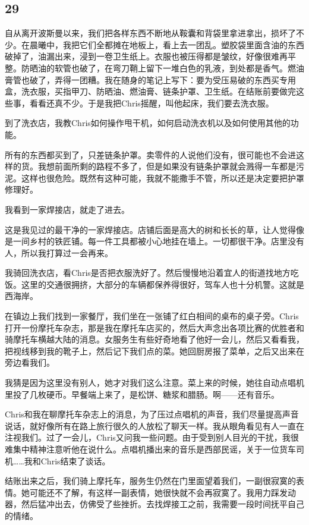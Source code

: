 \documentclass[UTF8]{article}
\begin{document}
\subsection*{29}
\par 自从离开波斯曼以来，我们把各样东西不断地从鞍囊和背袋里拿进拿出，损坏了不少。在晨曦中，我把它们全都摊在地板上，看上去一团乱。塑胶袋里面含油的东西破掉了，油漏出来，浸到一卷卫生纸上。衣服也被压得都是皱纹，好像很难再平整。防晒油的软管也破了，在弯刀鞘上留下一堆白色的乳液，到处都是香气。燃油膏管也破了，弄得一团糟。我在随身的笔记上写下：要为受压易破的东西买专用盒，洗衣服，买指甲刀、防晒油、燃油膏、链条护罩、卫生纸。在结账前要做完这些事，看看还真不少。于是我把Chris摇醒，叫他起床，我们要去洗衣服。
\par 到了洗衣店，我教Chris如何操作甩干机，如何启动洗衣机以及如何使用其他的功能。
\par 所有的东西都买到了，只差链条护罩。卖零件的人说他们没有，很可能也不会进这样的货。我想前面所剩的路程不多了，但是如果没有链条护罩就会溅得一车都是污泥。这样也很危险。既然有这种可能，我就不能撒手不管，所以还是决定要把护罩修理好。
\par 我看到一家焊接店，就走了进去。
\par 这是我见过的最干净的一家焊接店。店铺后面是高大的树和长长的草，让人觉得像是一间乡村的铁匠铺。每一件工具都被小心地挂在墙上。一切都很干净。店里没有人，所以我打算过一会再来。
\par 我骑回洗衣店，看Chris是否把衣服洗好了。然后慢慢地沿着宜人的街道找地方吃饭。这里的交通很拥挤，大部分的车辆都保养得很好，驾车人也十分机警。这就是西海岸。
\par 在镇边上我们找到一家餐厅，我们坐在一张铺了红白相间的桌布的桌子旁。Chris打开一份摩托车杂志，那是我在摩托车店买的，然后大声念出各项比赛的优胜者和骑摩托车横越大陆的消息。女服务生有些好奇地看了他好一会儿，然后又看看我，把视线移到我的靴子上，然后记下我们点的菜。她回厨房报了菜单，之后又出来在旁边看我们。
\par 我猜是因为这里没有别人，她才对我们这么注意。菜上来的时候，她往自动点唱机里投了几枚硬币。早餐端上来了，是松饼、糖浆和腊肠。啊——还有音乐。
\par Chris和我在聊摩托车杂志上的消息，为了压过点唱机的声音，我们尽量提高声音说话，就好像所有在路上旅行很久的人放松了聊天一样。我从眼角看见有人一直在注视我们。过了一会儿，Chris又问我一些问题。由于受到别人目光的干扰，我很难集中精神注意听他在说什么。点唱机播出来的音乐是西部民谣，关于一位货车司机……我和Chris结束了谈话。
\par 结账出来之后，我们骑上摩托车，服务生仍然在门里面望着我们，一副很寂寞的表情。她可能还不了解，有这样一副表情，她很快就不会再寂寞了。我用力踩发动器，然后猛冲出去，仿佛受了些挫折。去找焊接工之前，我需要一段时间抚平自己的情绪。
\end{document}
